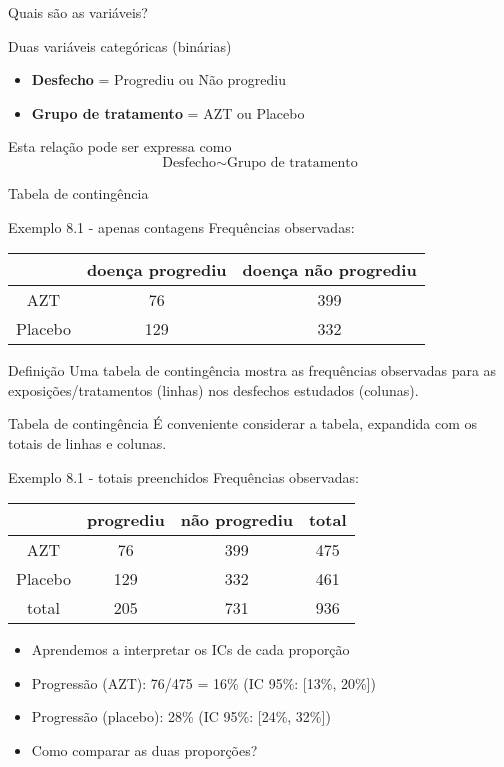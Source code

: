 \documentclass{beamer}
\begin{document}
\begin{frame}{Quais são as variáveis?}

  \begin{block}{Duas variáveis categóricas (binárias)}
  \begin{itemize}
  \item {\bf Desfecho} = Progrediu ou Não progrediu
  \item {\bf Grupo de tratamento} = AZT ou Placebo
  \end{itemize}
  \end{block}
  \begin{block}{Esta relação pode ser expressa como}
    \begin{displaymath}
      \text{Desfecho} \sim \text{Grupo de tratamento}
    \end{displaymath}
  \end{block}
\end{frame}

\begin{frame}{Tabela de contingência}
  \begin{exampleblock}{Exemplo 8.1 - apenas contagens}
    Frequências observadas:
    \begin{tabular}{c|c|c}
      & doença progrediu & doença não progrediu\\
      \hline
      AZT & 76 & 399 \\
      \hline
      Placebo & 129 & 332 \\
    \end{tabular}
  \end{exampleblock}
  \begin{block}{Definição}
    Uma \alert{tabela de contingência} mostra as frequências
    observadas para as exposições/tratamentos (linhas) nos desfechos estudados (colunas).
  \end{block}
\end{frame}

\begin{frame}{Tabela de contingência}
  É conveniente considerar a tabela, expandida com os totais de linhas e colunas.
    \begin{exampleblock}{Exemplo 8.1 - totais preenchidos}
    Frequências observadas:
    \begin{tabular}{c|c|c|c}
      & progrediu & não progrediu & total\\
      \hline
      AZT & 76 & 399 & 475\\
      \hline
      Placebo & 129 & 332 & 461\\
      \hline
      total & 205 & 731 & 936\\
    \end{tabular}
  \end{exampleblock}
  \begin{itemize}
  \item Aprendemos a interpretar os ICs de cada proporção
  \item Progressão (AZT): 76/475 = 16\% (IC 95\%: [13\%, 20\%])
  \item Progressão (placebo): 28\% (IC 95\%: [24\%, 32\%])
  \item Como comparar as duas proporções?
  \end{itemize}
\end{frame}
\end{document}
